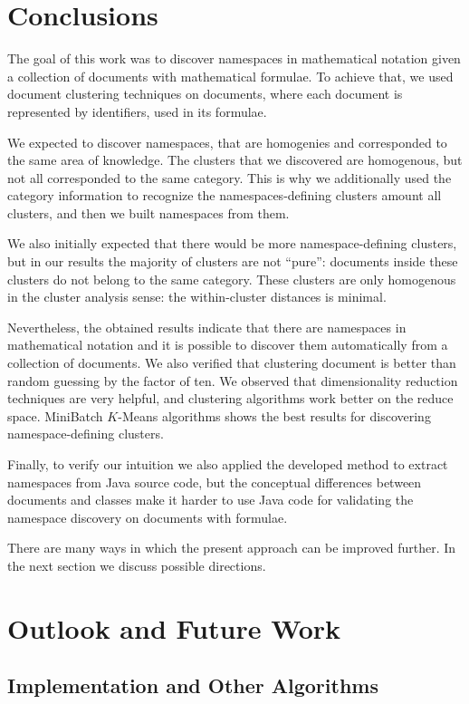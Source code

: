 \section{Conclusions}

The goal of this work was to discover namespaces in mathematical notation
given a collection of documents with mathematical formulae. To achieve that,
we used document clustering techniques on documents, where each document is 
represented by identifiers, used in its formulae. 

We expected to discover namespaces, that are homogenies and corresponded
to the same area of knowledge. The clusters that we discovered are homogenous, 
but not all corresponded to the same category. This is why we 
additionally used the category information to recognize the namespaces-defining
clusters amount all clusters, and then we built namespaces from them.

We also initially expected that there would be more namespace-defining clusters, 
but in our results the majority of clusters are not ``pure'': documents inside these 
clusters do not belong to the same category. These clusters are only homogenous in 
the cluster analysis sense: the within-cluster distances is minimal. 


Nevertheless, the obtained results indicate that there are namespaces in mathematical 
notation and it is possible to discover them automatically from a collection of 
documents. We also verified that clustering document is better than random guessing 
by the factor of ten. We observed that dimensionality reduction techniques 
are very helpful, and clustering algorithms work better on the reduce space. 
MiniBatch $K$-Means algorithms shows the best results for discovering 
namespace-defining clusters.

Finally, to verify our intuition we also applied the developed method to extract 
namespaces from Java source code, but the conceptual differences between documents 
and classes make it harder to use Java code for validating the namespace discovery 
on documents with formulae. 

There are many ways in which the present approach can be improved further.
In the next section we discuss possible directions.


\section{Outlook and Future Work}

\subsection{Implementation and Other Algorithms}  %

